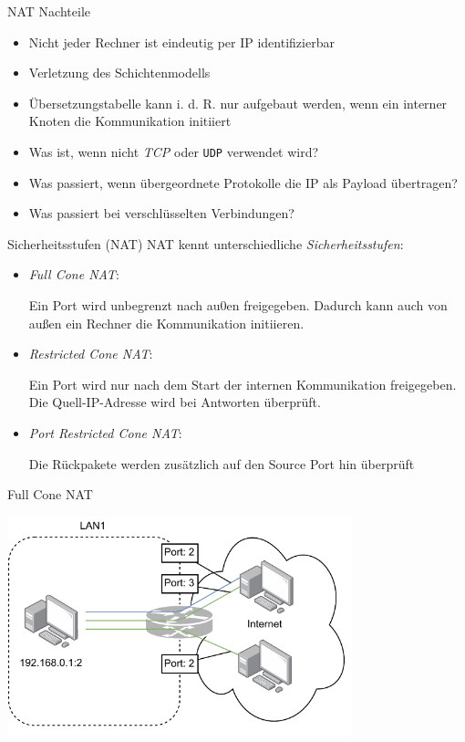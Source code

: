 \begin{bonus}{NAT Nachteile}
    \begin{itemize}
        \item Nicht jeder Rechner ist eindeutig per IP identifizierbar
        \item Verletzung des Schichtenmodells
        \item Übersetzungstabelle kann i. d. R. nur aufgebaut werden, wenn ein interner Knoten die Kommunikation initiiert
        \item Was ist, wenn nicht \emph{TCP} oder \texttt{UDP} verwendet wird?
        \item Was passiert, wenn übergeordnete Protokolle die IP als Payload übertragen?
        \item Was passiert bei verschlüsselten Verbindungen?
    \end{itemize}
\end{bonus}

\begin{bonus}{Sicherheitsstufen (NAT)}
    NAT kennt unterschiedliche \emph{Sicherheitsstufen}:
    \begin{itemize}
        \item \emph{Full Cone NAT}:

              Ein Port wird unbegrenzt nach au0en freigegeben.
              Dadurch kann auch von außen ein Rechner die Kommunikation initiieren.
        \item \emph{Restricted Cone NAT}:

              Ein Port wird nur nach dem Start der internen Kommunikation freigegeben.
              Die Quell-IP-Adresse wird bei Antworten überprüft.
        \item \emph{Port Restricted Cone NAT}:

              Die Rückpakete werden zusätzlich auf den Source Port hin überprüft
    \end{itemize}
\end{bonus}

\begin{bonus}{Full Cone NAT}
    \begin{center}
        \includegraphics[width=0.75\textwidth]{includes/figures/bonus_full_cone_nat.pdf}
    \end{center}
\end{bonus}

